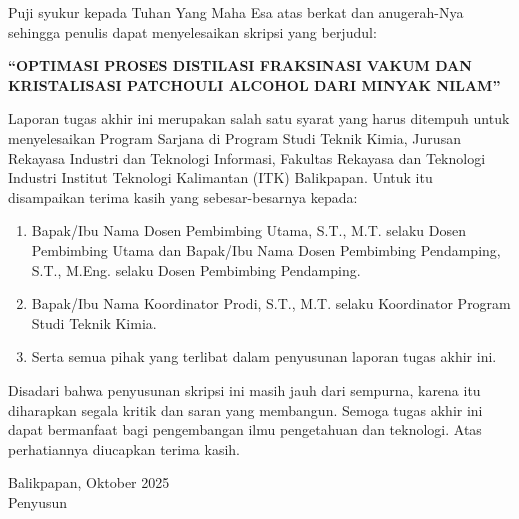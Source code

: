 \documentclass[skripsi,laporan]{itkta2025}
\begin{document}
\makecover

\makeorisinalitas
\makepublikasi
\makepengeshan

Puji syukur kepada Tuhan Yang Maha Esa atas berkat dan anugerah-Nya sehingga penulis dapat menyelesaikan skripsi yang berjudul:
\begin{center}
  \textbf{``OPTIMASI PROSES DISTILASI FRAKSINASI VAKUM DAN KRISTALISASI PATCHOULI ALCOHOL DARI MINYAK NILAM''}
\end{center}

Laporan tugas akhir ini merupakan salah satu syarat yang harus ditempuh untuk menyelesaikan Program Sarjana di Program Studi Teknik Kimia, Jurusan Rekayasa Industri dan Teknologi Informasi, Fakultas Rekayasa dan Teknologi Industri Institut Teknologi Kalimantan (ITK) Balikpapan. Untuk itu disampaikan terima kasih yang sebesar-besarnya kepada:
\begin{enumerate}[label=\arabic*.]
  \item Bapak/Ibu Nama Dosen Pembimbing Utama, S.T., M.T. selaku Dosen Pembimbing Utama dan Bapak/Ibu Nama Dosen Pembimbing Pendamping, S.T., M.Eng. selaku Dosen Pembimbing Pendamping.
  \item Bapak/Ibu Nama Koordinator Prodi, S.T., M.T. selaku Koordinator Program Studi Teknik Kimia.
  \item Serta semua pihak yang terlibat dalam penyusunan laporan tugas akhir ini.
\end{enumerate}

Disadari bahwa penyusunan skripsi ini masih jauh dari sempurna, karena itu diharapkan segala kritik dan saran yang membangun. Semoga tugas akhir ini dapat bermanfaat bagi pengembangan ilmu pengetahuan dan teknologi. Atas perhatiannya diucapkan terima kasih.

\vspace{1.2cm}
\begin{flushright}
  Balikpapan, Oktober 2025\\[1.5cm]
  Penyusun
\end{flushright}
\end{document}
